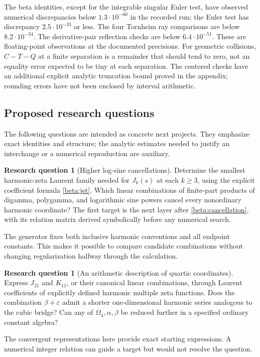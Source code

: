 \documentclass[11pt]{article}
\numberwithin{equation}{section}
\theoremstyle{definition}
\newtheorem{question}[theorem]{Research question}
\theoremstyle{remark}
\begin{document}
The beta identities, except for the integrable singular Euler test,
have observed numerical discrepancies below $1.3\cdot10^{-60}$ in the
recorded run; the Euler test has discrepancy $2.5\cdot10^{-33}$ or less.
The four Tornheim ray comparisons are below $8.2\cdot10^{-34}$.
The derivative-pair reflection checks are below $6.4\cdot10^{-51}$.
These are floating-point observations at the documented precisions.
For geometric collisions, $C-T-Q$ at a finite separation is a remainder
that should tend to zero, not an equality error expected to be tiny at
each separation. The centered checks have an additional explicit
analytic truncation bound proved in the appendix; rounding errors have
not been enclosed by interval arithmetic.

\subsection{Proposed research questions}

The following questions are intended as concrete next projects. They
emphasize exact identities and structure; the analytic estimates needed
to justify an interchange or a numerical reproduction are auxiliary.

\begin{question}[Higher log-sine cancellations]\label{rq:logs}
Determine the smallest harmonic-zeta Laurent family needed for
$J_k(s)$ at each $k\ge3$, using the explicit coefficient formula
\eqref{beta:jet}. Which linear combinations of finite-part products of
digamma, polygamma, and logarithmic sine powers cancel every nonordinary
harmonic coordinate? The first target is the next layer after
\eqref{beta:cancellation}, with its relation matrix derived symbolically
before any numerical search.
\end{question}
The generator fixes both inclusive harmonic conventions and all
endpoint constants. This makes it possible to compare candidate
combinations without changing regularization halfway through the
calculation.

\begin{question}[An arithmetic description of quartic coordinates]
Express $J_{21}$ and $K_{11}$, or their canonical linear combinations,
through Laurent coefficients of explicitly defined harmonic multiple
zeta functions. Does the combination $\beta+\varepsilon$ admit a
shorter one-dimensional harmonic series analogous to the cubic bridge?
Can any of $\Omega_4,\alpha,\beta$ be reduced further in a specified
ordinary constant algebra?
\end{question}
The convergent representations here provide exact starting expressions.
A numerical integer relation can guide a target but would not resolve
the question.
\end{document}
